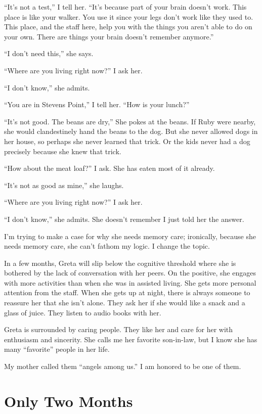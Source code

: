 \documentclass[
  letterpaper,
  DIV=11,
  numbers=noendperiod]{scrreprt}
\begin{document}
``It's not a test,'' I tell her. ``It's because part of your brain
doesn't work. This place is like your walker. You use it since your legs
don't work like they used to. This place, and the staff here, help you
with the things you aren't able to do on your own. There are things your
brain doesn't remember anymore.''

``I don't need this,'' she says.

``Where are you living right now?'' I ask her.

``I don't know,'' she admits.

``You are in Stevens Point,'' I tell her. ``How is your lunch?''

``It's not good. The beans are dry,'' She pokes at the beans. If Ruby
were nearby, she would clandestinely hand the beans to the dog. But she
never allowed dogs in her house, so perhaps she never learned that
trick. Or the kids never had a dog precisely because she knew that
trick.

``How about the meat loaf?'' I ask. She has eaten most of it already.

``It's not as good as mine,'' she laughs.

``Where are you living right now?'' I ask her.

``I don't know,'' she admits. She doesn't remember I just told her the
answer.

I'm trying to make a case for why she needs memory care; ironically,
because she needs memory care, she can't fathom my logic. I change the
topic.

In a few months, Greta will slip below the cognitive threshold where she
is bothered by the lack of conversation with her peers. On the positive,
she engages with more activities than when she was in assisted living.
She gets more personal attention from the staff. When she gets up at
night, there is always someone to reassure her that she isn't alone.
They ask her if she would like a snack and a glass of juice. They listen
to audio books with her.

Greta is surrounded by caring people. They like her and care for her
with enthusiasm and sincerity. She calls me her favorite son-in-law, but
I know she has many ``favorite'' people in her life.

My mother called them ``angels among us.'' I am honored to be one of
them.


\chapter*{Only Two Months}\label{only-two-months}
\end{document}
